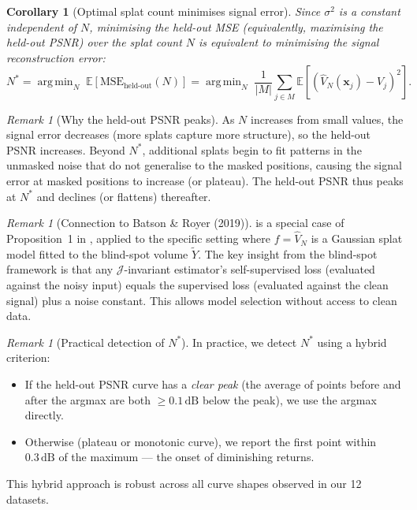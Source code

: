 \documentclass[11pt, a4paper]{article}
\theoremstyle{plain}
\newtheorem{corollary}[theorem]{Corollary}
\theoremstyle{definition}
\theoremstyle{remark}
\newtheorem{remark}[theorem]{Remark}
\newcommand{\E}{\mathbb{E}}
\DeclareMathOperator*{\argmin}{arg\,min}
\newcommand{\bx}{\bm{x}}
\newcommand{\MSE}{\mathrm{MSE}}
\newcommand{\dB}{\,\mathrm{dB}}
\newcommand{\Jcal}{\mathcal{J}}
\begin{document}
\begin{corollary}[Optimal splat count minimises signal error]
\label{cor:optimal-N}
Since $\sigma^2$ is a constant independent of $N$, minimising the
held-out MSE (equivalently, maximising the held-out PSNR) over the
splat count $N$ is equivalent to minimising the signal reconstruction
error:
\begin{equation}
  N^* = \argmin_N\; \E\left[\MSE_{\text{held-out}}(N)\right]
      = \argmin_N\; \frac{1}{|M|}\sum_{j\in M}
        \E\left[(\hat{V}_N(\bx_j) - V_j)^2\right].
\end{equation}
\end{corollary}

\begin{remark}[Why the held-out PSNR peaks]
As $N$ increases from small values, the signal error decreases (more
splats capture more structure), so the held-out PSNR increases. Beyond
$N^*$, additional splats begin to fit patterns in the unmasked noise
that do not generalise to the masked positions, causing the signal error
at masked positions to increase (or plateau). The held-out PSNR thus
peaks at $N^*$ and declines (or flattens) thereafter.
\end{remark}

\begin{remark}[Connection to Batson \& Royer (2019)]
 is a special case of Proposition~1 in
\citet{batson2019noise2self}, applied to the specific setting where
$f = \hat{V}_N$ is a Gaussian splat model fitted to the blind-spot
volume $\tilde{Y}$. The key insight from the blind-spot framework is
that any $\Jcal$-invariant estimator's self-supervised loss (evaluated
against the noisy input) equals the supervised loss (evaluated against
the clean signal) plus a noise constant. This allows model selection
without access to clean data.
\end{remark}

\begin{remark}[Practical detection of $N^*$]
\label{rem:detection}
In practice, we detect $N^*$ using a hybrid criterion:
\begin{itemize}
  \item If the held-out PSNR curve has a \emph{clear peak} (the average
    of points before and after the argmax are both $\ge 0.1\dB$ below
    the peak), we use the argmax directly.
  \item Otherwise (plateau or monotonic curve), we report the first
    point within $0.3\dB$ of the maximum --- the onset of diminishing
    returns.
\end{itemize}
This hybrid approach is robust across all curve shapes observed in our
12 datasets.
\end{remark}
\end{document}
